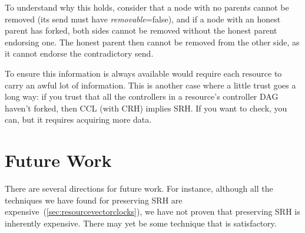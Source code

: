 \documentclass[a4paper,USenglish,cleveref, autoref, thm-restate, anonymous]{lipics-v2021}
\begin{document}
To understand why this holds, consider that a node with no parents cannot be removed (its send must have \emph{removable}=false), and if a node with an honest parent has forked, both sides cannot be removed without the honest parent endorsing one.
The honest parent then cannot be removed from the other side, as it cannot endorse the contradictory send.

To ensure this information is always available would require each resource to carry an awful lot of information.
This is another case where a little trust goes a long way: if you trust that all the controllers in a resource's controller DAG haven't forked, then CCL (with CRH) implies SRH.
If you want to check, you can, but it requires acquiring more data.















\section{Future Work}
There are several directions for future work. 
For instance, although all the techniques we have found for preserving SRH are expensive~(\cref{sec:resourcevectorclocks}), we have not proven that preserving SRH is inherently expensive. 
There may yet be some technique that is satisfactory. 
\end{document}
